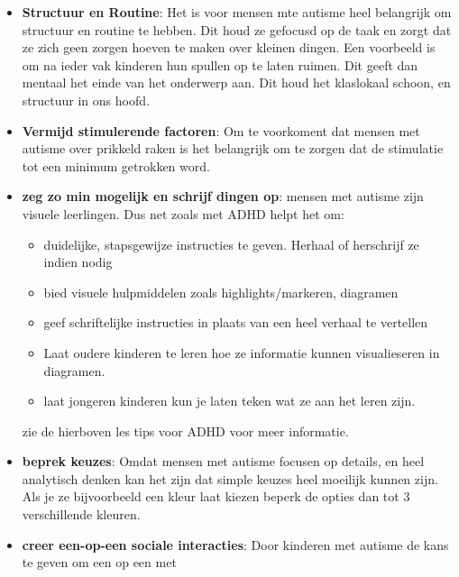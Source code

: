 \documentclass{article}
\begin{document}
                     \begin{itemize}
                         \item \textbf{Structuur en Routine}\cite{autisme-teaching-them}:
                             Het is voor mensen mte autisme heel belangrijk om structuur en routine te hebben. Dit houd ze gefocusd op de taak en zorgt dat ze zich geen zorgen hoeven te maken over kleinen dingen. Een voorbeeld is om na ieder vak kinderen hun spullen op te laten ruimen. Dit geeft dan mentaal het einde van het onderwerp aan. Dit houd het klaslokaal schoon, en structuur in ons hoofd.
                         \item \textbf{Vermijd stimulerende factoren}\cite{autisme-teaching-them}:
                             Om te voorkoment dat mensen met autisme over prikkeld raken is het belangrijk om te zorgen dat de stimulatie tot een minimum getrokken word.
                         \item \textbf{zeg zo min mogelijk en schrijf dingen op}\cite{autisme-teaching-them}:
                             mensen met autisme zijn visuele leerlingen\cite{autisme-visual}. Dus net zoals met ADHD helpt het om:
                                 \begin{itemize}
                                     \item duidelijke, stapsgewijze instructies te geven. Herhaal of herschrijf ze indien nodig
                                     \item bied visuele hulpmiddelen zoals highlights/markeren, diagramen 
                                     \item geef schriftelijke instructies in plaats van een heel verhaal te vertellen
                                     \item Laat oudere kinderen te leren hoe ze informatie kunnen visualieseren in diagramen.
                                     \item laat jongeren kinderen kun je laten teken wat ze aan het leren zijn. 
                             \end{itemize}
                             zie de hierboven les tips voor ADHD voor meer informatie.
                         \item \textbf{beprek keuzes}\cite{autisme-teaching-them}:
                             Omdat mensen met autisme focusen op details, en heel analytisch denken kan het zijn dat simple keuzes heel moeilijk kunnen zijn. Als je ze bijvoorbeeld een kleur laat kiezen beperk de opties dan tot 3 verschillende kleuren.
                         \item \textbf{creer een-op-een sociale interacties}\cite{autisme-teaching-them}:
                             Door kinderen met autisme de kans te geven om een op een met 
                     \end{itemize}
\end{document}
